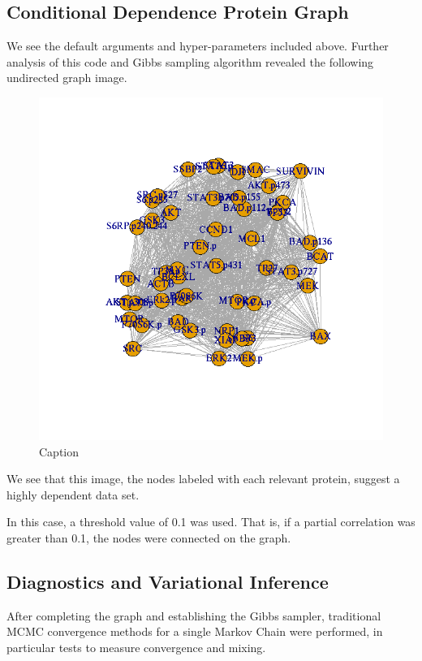 \documentclass{article}
\begin{document}
\subsection{Conditional Dependence Protein Graph}
We see the default arguments and hyper-parameters included above. Further analysis of this code and Gibbs sampling algorithm revealed the following undirected graph image. 
\begin{figure}
    \centering
    \includegraphics[width=1\linewidth]{Conditional_Density_Network.png}
    \caption{Caption}
    \label{fig:enter-label}
\end{figure}
\pagebreak
We see that this image, the nodes labeled with each relevant protein, suggest a highly dependent data set. 

In this case, a threshold value of 0.1 was used. That is, if a partial correlation was greater than 0.1, the nodes were connected on the graph. 

\subsection{Diagnostics and Variational Inference}

After completing the graph and establishing the Gibbs sampler, traditional MCMC convergence methods for a single Markov Chain were performed, in particular tests to measure convergence and mixing. 
\end{document}
